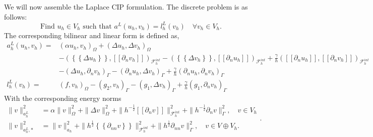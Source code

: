 \documentclass[11pt]{article}
\theoremstyle{remark}
\newcommand{\mean}[1]{\left\{\!\!\left\{#1\right\}\!\!\right\}}
\newcommand{\jump}[1]{\left[\!\left[ #1 \right]\!\right]}
\numberwithin{equation}{section}
\begin{document}
We will now assemble the Laplace CIP formulation.
The discrete problem is as follows:
 \begin{equation}
     \label{eq:laplace_prob}
    \text{Find } u_{h} \in V_{h} \text{ such that } a^{L}( u_{h}, v_{h})  = l_{h}^{L}( v_{h} )  \quad \forall v_{h} \in  V_{h}.
\end{equation}
The corresponding bilinear and linear form is defined as,
    \begin{equation}
        \label{eq:cip_laplace_form}
        \begin{split}
            a_{h}^{L} \left( u_{h}, v_{h} \right)   =&
            \left( \alpha  u_{h}, v_{h} \right) _{\Omega }   +  \left( \Delta  u_{h}, \Delta v_{h} \right) _{ \Omega } \\
                                             & - \left( \mean{  \Delta  u_{h} }, \jump{ \partial _{n }v_{h}} \right)_{\mathcal{F}_{h}^{int}  }  - \left( \mean{ \Delta  v_{h} }, \jump{ \partial _{n}u_{h} }      \right)_{\mathcal{F}_{h}^{int}  }  + \frac{\gamma }{h}
                                             \left( \jump{ \partial _{n} u_{h}}, \jump{ \partial _{n} v_{h}   }   \right)_{\mathcal{F}_{h}^{int} } \\
                                             & - \left(   \Delta  u_{h} ,  \partial _{n }v_{h} \right)_{\Gamma   }  - \left(  \partial _{n}u_{h},  \Delta  v_{h} \right)_{\Gamma  }  + \frac{\gamma }{h}  \left(  \partial _{n} u_{h},  \partial _{n} v_{h}      \right)_{ \Gamma } \\
                                             l^{L}_{h}( v_{h})  =&  \left( f, v_{h} \right) _{\Omega } - ( g_{2},  v_{h} )_{\Gamma } -  ( g_{1}, \Delta  v_{h}  )_{\Gamma }  + \frac{\gamma }{h} ( g_{1}, \partial _{n} v_{h}  )_{\Gamma }
                                         \end{split}
                                     \end{equation}
                                     With the corresponding energy norms
                                     \begin{equation}
                                         \label{eq:a_cip_energy_norm_lap}
                                         \begin{split}
                                             \| v \|_{ a_{h}^{L} }^{ 2 }& = \alpha \| v\|_{ \Omega  }^{2  }  +  \| \Delta   v \|_{ \Omega   }^{ 2 }  + \|  h^{-\frac{1}{2}} \jump{ \partial _{n} v    }\|_{  \mathcal{F} _{h}^{int} }^{2  } +  \|  h^{-\frac{1}{2}}
                                             \partial _{n} v  \|_{  \Gamma  }^{2  },  \quad v \in V_{h}  \\
                                             \| v \|_{ a_{h}^{L},* }^{ 2 } &= \| v \|_{ a_{h} }^{ 2 }  + \| h^{\frac{1}{2}}  \mean{     \partial _{nn } v}  \|_{ \mathcal{F}_{h}^{int}   }^{  2}+ \| h^{\frac{1}{2}}       \partial _{nn } v  \|_{ \Gamma    }^{  2}, \quad  v\in V \oplus V_{h}.
                                         \end{split}
                                         .
                                     \end{equation}
\end{document}
